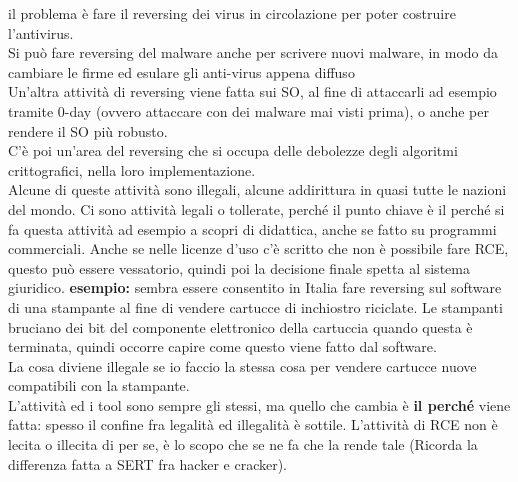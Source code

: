 \documentclass{article}
\begin{document}
il problema è fare il reversing dei virus in circolazione per poter costruire l'antivirus.\\ Si può fare reversing del malware anche per scrivere nuovi malware, in modo da cambiare le firme ed esulare gli anti-virus appena diffuso\\ Un'altra attività di reversing viene fatta sui SO, al fine di attaccarli ad esempio tramite 0-day (ovvero attaccare con dei malware mai visti prima), o anche per rendere il SO più robusto.\\ C'è poi un'area del reversing che si occupa delle debolezze degli algoritmi crittografici, nella loro implementazione.\\ Alcune di queste attività sono illegali, alcune addirittura in quasi tutte le nazioni del mondo. Ci sono attività  legali o tollerate, perché il punto chiave è il perché si fa questa attività ad esempio a scopri di didattica, anche se fatto su programmi commerciali. Anche se nelle licenze d'uso c'è scritto che non è possibile fare RCE, questo può essere vessatorio, quindi poi la decisione finale spetta al sistema giuridico. \textbf{esempio:} sembra essere consentito in Italia fare reversing sul software di una stampante al fine di vendere cartucce di inchiostro riciclate. Le stampanti bruciano dei bit del componente elettronico della cartuccia quando questa è terminata, quindi occorre capire come questo viene fatto dal software.\\ La cosa diviene illegale se io faccio la stessa cosa per vendere cartucce nuove compatibili con la stampante.\\ L'attività ed i tool sono sempre gli stessi, ma quello che cambia è \textbf{il perché} viene fatta: spesso il confine fra legalità ed illegalità è sottile. L'attività di RCE non è lecita o illecita di per se, è lo scopo che se ne fa che la rende tale (Ricorda la differenza fatta a SERT fra hacker e cracker).
\end{document}
